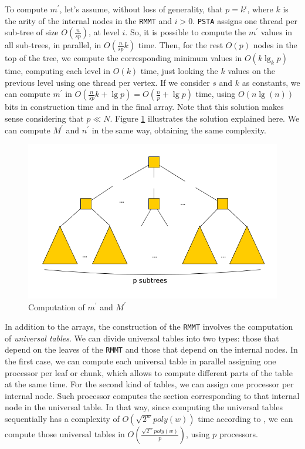 To compute $m^{\prime}$, let's assume, without loss of generality,
that $p = k^{i}$, where $k$ is the arity
of the internal nodes in the {\tt RMMT} and $i > 0$. {\tt PSTA}
assigns one thread per sub-tree of size $O(\frac{n}{sp})$, at level
$i$. So, it is possible to compute the $m^{\prime}$ values in all
sub-trees, in parallel, in $O(\frac{n}{sp}k)$ time. Then, for the
rest $O(p)$ nodes in the top of the tree, we compute the corresponding
minimum values in $O(k\lg_{k} p)$ time, computing each level in $O(k)$
time, just looking the $k$ values on the previous level using one
thread per vertex. If we consider $s$ and $k$ as constants, we can compute
$m^{\prime}$ in
$O(\frac{n}{sp}k + \lg p) = O(\frac{n}{p}+\lg p)$ time,
using $O(n\lg(n))$ bits in construction time and in the
final array. Note that this solution makes sense considering that
$p\ll N$. Figure \ref{fig:min-max-array} illustrates the solution
explained here. We can compute $M^{\prime}$ and $n^{\prime}$ in the
same way, obtaining the same complexity.

\begin{figure}[t]
  \centering
  \includegraphics[scale=0.28]{./images/Min-Max-array.png}
  \caption{Computation of $m^{\prime}$ and $M^{\prime}$}
  \label{fig:min-max-array} 
\end{figure}

In addition to the arrays, the construction of the {\tt RMMT} involves
the computation of \emph{universal tables}.
We can divide
universal tables into two types: those that depend on the leaves of
the {\tt RMMT} and those that depend on the internal nodes. In the
first case, we can compute each universal table in parallel assigning
one processor per leaf or chunk, which allows to compute different
parts of the table at the same time. For the second kind of tables, we
can assign one processor per internal node. Such processor computes
the section corresponding to that internal node in the universal
table. In that way, since computing the universal tables sequentially
has a complexity of $O(\sqrt{2^{w}}poly(w))$ time according to
\cite{Navarro:2014:FFS:2620785.2601073}, we can compute those
universal tables in $\displaystyle O(\frac{\sqrt{2^{w}}poly(w)}{p})$,
using $p$ processors.

